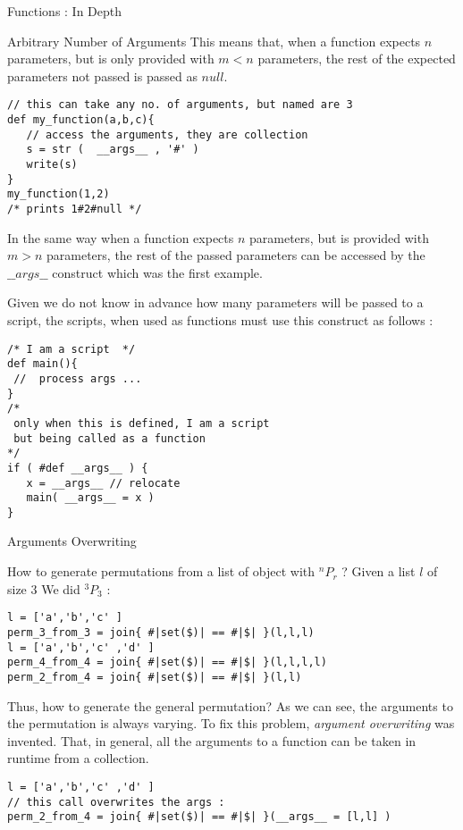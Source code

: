 \begin{section}{Functions : In Depth}
\begin{subsection}{Arbitrary Number of Arguments}
This means that, when a function expects $n$
parameters, but is only provided with $m < n $ parameters,
the rest of the expected  parameters not passed is passed as $null$.

\begin{lstlisting}[style=JexlStyle]
// this can take any no. of arguments, but named are 3 
def my_function(a,b,c){ 
   // access the arguments, they are collection  
   s = str (  __args__ , '#' )
   write(s)  
}
my_function(1,2)
/* prints 1#2#null */
\end{lstlisting}

In the same way when a function expects $n$
parameters, but is provided with $m > n $ parameters,
the rest of the passed  parameters can be accessed by the $\_\_args\_\_$ construct
 which was the first example.

Given we do not know in advance how many parameters will be passed 
to a script, the scripts, when used as functions must use this construct
as follows :

\begin{lstlisting}[style=JexlStyle]
/* I am a script  */
def main(){
 //  process args ...
}
/*
 only when this is defined, I am a script
 but being called as a function 
*/
if ( #def __args__ ) {
   x = __args__ // relocate 
   main( __args__ = x )
}
\end{lstlisting}
\end{subsection}

\begin{subsection}{Arguments Overwriting}

How to generate permutations from a list of object with 
$ ^nP_r$ ? Given a list $l$ of size $3$ We did $ ^3P_3$ :
\begin{lstlisting}[style=JexlStyle]
l = ['a','b','c' ]
perm_3_from_3 = join{ #|set($)| == #|$| }(l,l,l)
l = ['a','b','c' ,'d' ]
perm_4_from_4 = join{ #|set($)| == #|$| }(l,l,l,l)
perm_2_from_4 = join{ #|set($)| == #|$| }(l,l)
\end{lstlisting}
Thus, how to generate the general permutation?
As we can see, the arguments to the permutation 
is always varying. To fix this problem, 
\emph{argument overwriting} was invented.
That, in general, all the arguments to a function 
can be taken in runtime from a collection.

\begin{lstlisting}[style=JexlStyle]
l = ['a','b','c' ,'d' ]
// this call overwrites the args :
perm_2_from_4 = join{ #|set($)| == #|$| }(__args__ = [l,l] )
\end{lstlisting}


\end{subsection}
\end{section}

